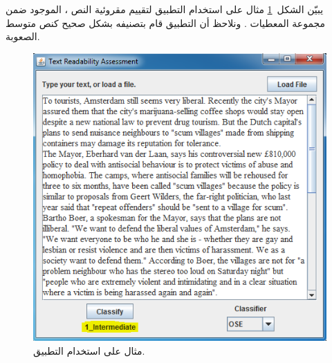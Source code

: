 يبيّن الشكل~\ref{fig:man:ex} مثال على استخدام التطبيق لتقييم مقروئية النص ،
الموجود ضمن مجموعة المعطيات .
ونلاحظ أن التطبيق قام بتصنيفه بشكل صحيح كنص متوسط الصعوبة.

\begin{figure}[htb]
	\centering
	\includegraphics[width=0.7\linewidth]{images/app-ex.png}
	\caption{%
		مثال على استخدام التطبيق.
	}
	\label{fig:man:ex}
\end{figure}

